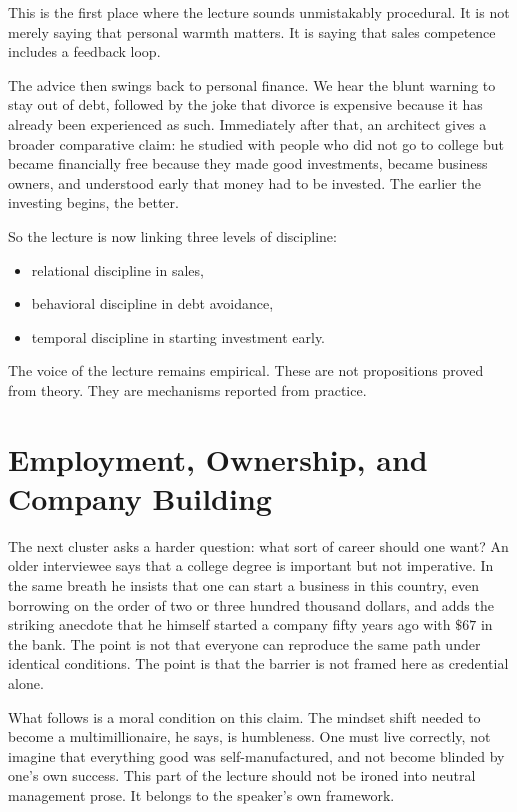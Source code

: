 This is the first place where the lecture sounds unmistakably procedural. It is not merely saying that personal warmth matters. It is saying that sales competence includes a feedback loop.

The advice then swings back to personal finance. We hear the blunt warning to stay out of debt, followed by the joke that divorce is expensive because it has already been experienced as such. Immediately after that, an architect gives a broader comparative claim: he studied with people who did not go to college but became financially free because they made good investments, became business owners, and understood early that money had to be invested. The earlier the investing begins, the better.

So the lecture is now linking three levels of discipline:
\begin{itemize}
\item relational discipline in sales,
\item behavioral discipline in debt avoidance,
\item temporal discipline in starting investment early.
\end{itemize}

The voice of the lecture remains empirical. These are not propositions proved from theory. They are mechanisms reported from practice.

\section{Employment, Ownership, and Company Building}

The next cluster asks a harder question: what sort of career should one want? An older interviewee says that a college degree is important but not imperative. In the same breath he insists that one can start a business in this country, even borrowing on the order of two or three hundred thousand dollars, and adds the striking anecdote that he himself started a company fifty years ago with \( \$67 \) in the bank. The point is not that everyone can reproduce the same path under identical conditions. The point is that the barrier is not framed here as credential alone.

What follows is a moral condition on this claim. The mindset shift needed to become a multimillionaire, he says, is humbleness. One must live correctly, not imagine that everything good was self-manufactured, and not become blinded by one's own success. This part of the lecture should not be ironed into neutral management prose. It belongs to the speaker's own framework.

